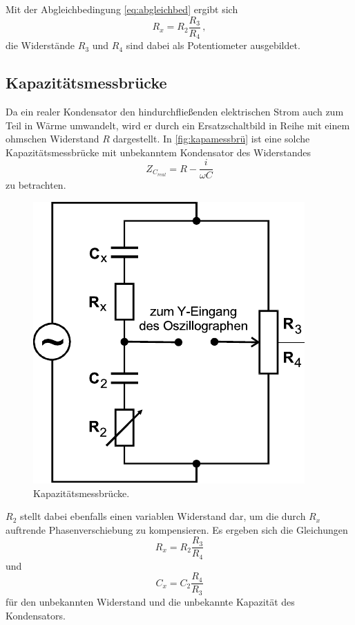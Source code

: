 Mit der Abgleichbedingung \eqref{eq:abgleichbed} ergibt sich
\begin{equation*}
    R_x = R_2 \frac{R_3}{R_4} \,,
    \label{eq:resxWheatstone}
\end{equation*}
die Widerstände $R_3$ und $R_4$ sind dabei als Potentiometer ausgebildet.


\subsection{Kapazitätsmessbrücke}
\label{subsec:kapamessbrü}

Da ein realer Kondensator den hindurchfließenden elektrischen Strom auch zum Teil in Wärme umwandelt, wird er durch ein Ersatzschaltbild in Reihe mit einem ohmschen Widerstand $R$ dargestellt. 
In \autoref{fig:kapamessbrü} ist eine solche Kapazitätsmessbrücke mit unbekanntem Kondensator des Widerstandes
\begin{equation*}
    Z_{C_{real}} = R - \frac{i}{ω C}
\end{equation*} zu betrachten.

\begin{figure}[H]
    \centering
    \includegraphics{figures/Kapazitätsmessbrücke.pdf}
    \caption{Kapazitätsmessbrücke\cite{ap07}.}
    \label{fig:kapamessbrü}
\end{figure}

$R_2$ stellt dabei ebenfalls einen variablen Widerstand dar, um die durch $R_x$ auftrende Phasenverschiebung zu kompensieren.
Es ergeben sich die Gleichungen
\begin{equation*}
    R_x = R_2 \frac{R_3}{R_4}
    \label{eq:resxkapbrü}
\end{equation*}
und 
\begin{equation*}
    C_x = C_2 \frac{R_4}{R_3}
    \label{eq:kapxkapbrü}
\end{equation*}
für den unbekannten Widerstand und die unbekannte Kapazität des Kondensators.


